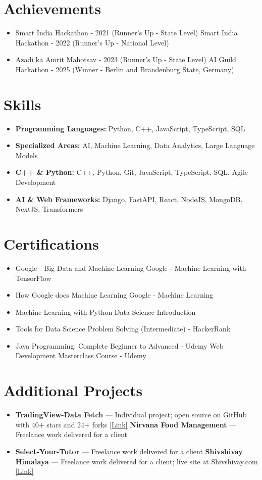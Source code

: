 \documentclass[a4paper,10pt]{article}
\begin{document}
\section*{Achievements}
\begin{itemize}
\item Smart India Hackathon - 2021 (Runner's Up - State Level) \hfill Smart India Hackathon - 2022 (Runner's Up - National Level)
\item Azadi ka Amrit Mahotsav - 2023 (Runner's Up - State Level) \hfill AI Guild Hackathon - 2025 (Winner - Berlin and Brandenburg State, Germany)
\end{itemize}

\section*{Skills}
\begin{itemize}
  \item \textbf{Programming Languages:} Python, C++, JavaScript, TypeScript, SQL
  \item \textbf{Specialized Areas:} AI, Machine Learning, Data Analytics, Large Language Models
  \item \textbf{C++ \& Python:} C++, Python, Git, JavaScript, TypeScript, SQL, Agile Development
  \item \textbf{AI \& Web Frameworks:} Django, FastAPI, React, NodeJS, MongoDB, NextJS, Transformers
\end{itemize}

\section*{Certifications}
\begin{itemize}
\item Google - Big Data and Machine Learning \hfill Google - Machine Learning with TensorFlow
\item How Google does Machine Learning \hfill Google - Machine Learning
\item Machine Learning with Python \hfill Data Science Introduction
\item Tools for Data Science \hfill Problem Solving (Intermediate) - HackerRank
\item Java Programming: Complete Beginner to Advanced - Udemy \hfill Web Development Masterclass Course - Udemy
\end{itemize}

\section*{Additional Projects}
\begin{itemize}
\item \textbf{TradingView-Data Fetch} — Individual project; open source on GitHub with 40+ stars and 24+ forks \href{https://github.com/ravalmeet/TradingView}{[Link]} \hfill \textbf{Nirvana Food Management} — Freelance work delivered for a client
\item \textbf{Select-Your-Tutor} — Freelance work delivered for a client \hfill \textbf{Shivshivay Himalaya} — Freelance work delivered for a client; live site at Shivshivay.com \href{Shivshivay.com}{[Link]}
\end{itemize}
\end{document}
